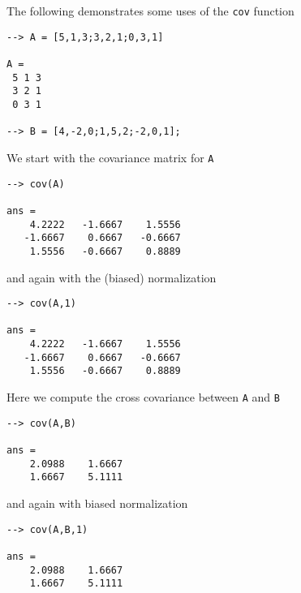The following demonstrates some uses of the \verb|cov| function
\begin{verbatim}
--> A = [5,1,3;3,2,1;0,3,1]

A = 
 5 1 3 
 3 2 1 
 0 3 1 

--> B = [4,-2,0;1,5,2;-2,0,1];
\end{verbatim}
We start with the covariance matrix for \verb|A|
\begin{verbatim}
--> cov(A)

ans = 
    4.2222   -1.6667    1.5556 
   -1.6667    0.6667   -0.6667 
    1.5556   -0.6667    0.8889 
\end{verbatim}
and again with the (biased) normalization
\begin{verbatim}
--> cov(A,1)

ans = 
    4.2222   -1.6667    1.5556 
   -1.6667    0.6667   -0.6667 
    1.5556   -0.6667    0.8889 
\end{verbatim}
Here we compute the cross covariance between \verb|A| and \verb|B|
\begin{verbatim}
--> cov(A,B)

ans = 
    2.0988    1.6667 
    1.6667    5.1111 
\end{verbatim}
and again with biased normalization
\begin{verbatim}
--> cov(A,B,1)

ans = 
    2.0988    1.6667 
    1.6667    5.1111 
\end{verbatim}
